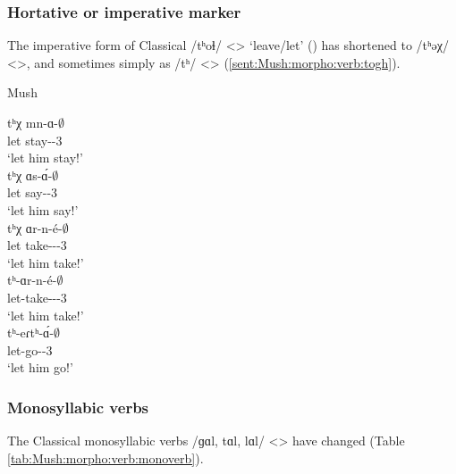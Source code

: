 \subsubsection{Hortative or imperative marker}

The imperative form of Classical /tʰoɬ/ <> `leave/let' () has shortened to /tʰəχ/ <>, and sometimes simply as /tʰ/ <> (\ref{sent:Mush:morpho:verb:togh}). 

\begin{exe}
	\ex Mush \label{sent:Mush:morpho:verb:togh}
	\begin{xlist}
		\ex \gll tʰχ mn-ɑ-$\emptyset$ \\
		let stay-{\thgloss}-3{\sg} \\
		\trans `let him stay!' \\
		\ex \gll tʰχ ɑs-\'ɑ-$\emptyset$ \\
		let say-{\thgloss}-3{\sg} \\
		\trans `let him say!' \\
		\ex \gll tʰχ ɑr-n-\'e-$\emptyset$ \\
		let take-{\vx}-{\thgloss}-3{\sg} \\
		\trans `let him take!' \\
		\ex \gll tʰ-ɑr-n-\'e-$\emptyset$ \\
		let-take-{\vx}-{\thgloss}-3{\sg} \\
		\trans `let him take!' \\
		\ex \gll tʰ-eɾtʰ-\'ɑ-$\emptyset$ \\
		let-go-{\thgloss}-3{\sg} \\
		\trans `let him go!' \\
	\end{xlist}
\end{exe}

\subsubsection{Monosyllabic verbs}

The Classical monosyllabic verbs /ɡɑl, tɑl, lɑl/ <> have changed (Table \ref{tab:Mush:morpho:verb:monoverb}). 


